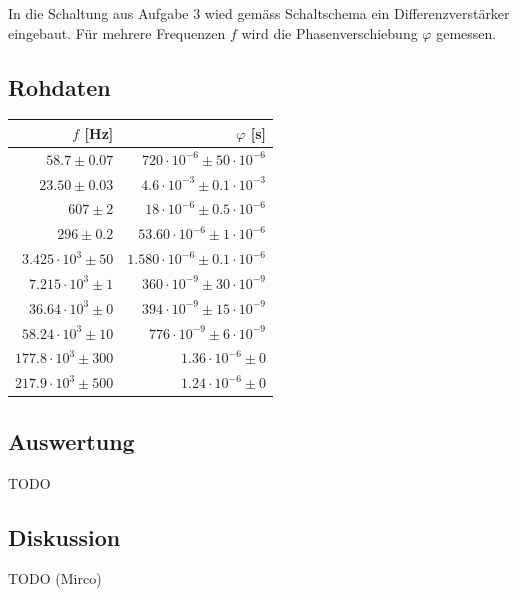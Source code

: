 \documentclass[12pt,a4paper]{article}
\begin{document}
\noindent
In die Schaltung aus Aufgabe 3 wied gem\"ass Schaltschema ein Differenzverst\"arker eingebaut. F\"ur mehrere Frequenzen $f$ wird die Phasenverschiebung $\varphi$ gemessen.

\subsection*{Rohdaten}
\begin{tabular}{|r|r|}
\hline
$f$ [Hz]&$\varphi$ [s]\\
\hline
$58.7 \pm 0.07$&$720\cdot 10^{-6} \pm 50\cdot 10^{-6}$\\
$23.50 \pm 0.03$&$4.6\cdot 10^{-3} \pm 0.1\cdot 10^{-3}$\\
$607 \pm 2$&$18\cdot 10^{-6} \pm 0.5\cdot 10^{-6}$\\
$296 \pm 0.2$&$53.60\cdot 10^{-6} \pm 1\cdot 10^{-6}$\\
$3.425\cdot 10^{3} \pm 50$&$1.580\cdot 10^{-6} \pm 0.1\cdot 10^{-6}$\\
$7.215\cdot 10^{3} \pm 1$&$360\cdot 10^{-9} \pm 30\cdot 10^{-9}$\\
$36.64\cdot 10^{3} \pm 0$&$394\cdot 10^{-9} \pm 15\cdot 10^{-9}$\\
$58.24\cdot 10^{3} \pm 10$&$776\cdot 10^{-9} \pm 6\cdot 10^{-9}$\\
$177.8\cdot 10^{3} \pm 300$&$1.36\cdot 10^{-6} \pm 0$\\
$217.9\cdot 10^{3} \pm 500$&$1.24\cdot 10^{-6} \pm 0$\\
\hline
\end{tabular}

\subsection*{Auswertung}
TODO

\subsection*{Diskussion}
TODO (Mirco)
\end{document}
